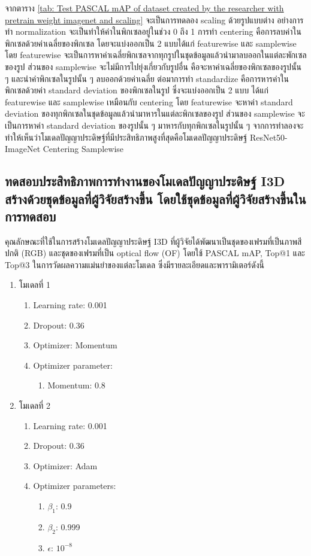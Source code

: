 จากตาราง \ref{tab: Test PASCAL mAP of dataset created by the researcher with pretrain weight imagenet and scaling} จะเป็นการทดลอง scaling ด้วยรูปแบบต่าง อย่างการทำ normalization จะเป็นทำให้ค่าในพิกเซลอยู่ในช่วง 0 ถึง 1 การทำ centering คือการลบค่าในพิกเซลด้วยค่าเฉลี่ยของพิกเซล โดยจะแบ่งออกเป็น 2 แบบได้แก่ featurewise และ samplewise โดย featurewise จะเป็นการหาค่าเฉลี่ยพิกเซลจากทุกรูปในชุดข้อมูลแล้วนำมาลบออกในแต่ละพักเซลของรูป ส่วนของ samplewise จะไม่มีการไปยุ่งเกี่ยวกับรูปอื่น คือจะหาค่าเฉลี่ยของพิกเซลของรูปนั้น ๆ และนำค่าพิกเซลในรูปนั้น ๆ ลบออกด้วยค่าเฉลี่ย ต่อมาการทำ standardize คือการหารค่าในพิกเซลด้วยค่า standard deviation ของพิกเซลในรูป ซึ่งจะแบ่งออกเป็น 2 แบบ ได้แก่ featurewise และ samplewise เหมือนกับ centering โดย featurewise จะหาค่า standard deviation ของทุกพิกเซลในชุดข้อมูลแล้วนำมาหารในแต่ละพิกเซลของรูป ส่วนของ samplewise จะเป็นการหาค่า standard deviation ของรูปนั้น ๆ มาหารกับทุกพิกเซลในรูปนั้น ๆ จากการทำลองจะทำให้เห็นว่าโมเดลปัญญาประดิษฐ์ที่มีประสิทธิภาพสูงที่สุดคือโมเดลปัญญาประดิษฐ์ ResNet50-ImageNet	 Centering Samplewise


\subsection{ทดสอบประสิทธิภาพการทำงานของโมเดลปัญญาประดิษฐ์ I3D สร้างด้วยชุดข้อมูลที่ผู้วิจัยสร้างขึ้น โดยใช้ชุดข้อมูลที่ผู้วิจัยสร้างขึ้นในการทดสอบ}
คุณลักษณะที่ใช้ในการสร้างโมเดลปัญญาประดิษฐ์ I3D ที่ผู้วิจัยได้พัฒนาเป็นชุดของเฟรมที่เป็นภาพสีปกติ (RGB) และชุดของเฟรมที่เป็น optical flow (OF) โดยใช้ PASCAL mAP, Top@1 และ Top@3
ในการวัดผลความแม่นยำของแต่ละโมเดล ซึ่งมีรายละเอียดและพารามิเตอร์ดังนี้
\begin{enumerate}
	\item โมเดลที่ 1
	\begin{enumerate}
		\item Learning rate: 0.001
		\item Dropout: 0.36
		\item Optimizer: Momentum
		\item Optimizer parameter:
		\begin{enumerate}
			\item Momentum: 0.8
		\end{enumerate}
	\end{enumerate}
	\item โมเดลที่ 2
	\begin{enumerate}
		\item Learning rate: 0.001
		\item Dropout: 0.36
		\item Optimizer: Adam
		\item Optimizer parameters:
		\begin{enumerate}
			\item $\beta_1$: 0.9
			\item $\beta_2$: 0.999
			\item $\epsilon$: $10^{-8}$
		\end{enumerate}
	\end{enumerate}
\end{enumerate}


